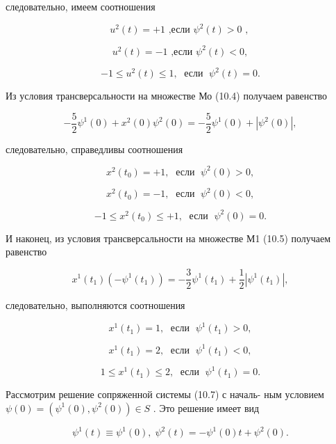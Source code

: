 \documentclass[8pt]{extarticle}
\begin{document}
следовательно, имеем соотношения

\[
{u}^{2}\left( t\right)  =  + 1\text{ ,если }{\psi }^{2}\left( t\right)  > 0\text{ , }
\]

\[
{u}^{2}\left( t\right)  =  - 1\text{ ,если }{\psi }^{2}\left( t\right)  < 0, \tag{10.8}
\]

\[
- 1 \leq  {u}^{2}\left( t\right)  \leq  1,\;\text{ если }\;{\psi }^{2}\left( t\right)  = 0.
\]

Из условия трансверсальности на множестве Мо (10.4) получаем равенство

\[
- \frac{5}{2}{\psi }^{1}\left( 0\right)  + {x}^{2}\left( 0\right) {\psi }^{2}\left( 0\right)  =  - \frac{5}{2}{\psi }^{1}\left( 0\right)  + \left| {{\psi }^{2}\left( 0\right) }\right| ,
\]

следовательно, справедливы соотношения

\[
{x}^{2}\left( {t}_{0}\right)  =  + 1,\;\text{ если }\;{\psi }^{2}\left( 0\right)  > 0,
\]

\[
{x}^{2}\left( {t}_{0}\right)  =  - 1,\;\text{ если }\;{\psi }^{2}\left( 0\right)  < 0, \tag{10.9}
\]

\[
- 1 \leq  {x}^{2}\left( {t}_{0}\right)  \leq   + 1,\;\text{ если }\;{\psi }^{2}\left( 0\right)  = 0.
\]

И наконец, из условия трансверсальности на множестве М1 (10.5) получаем равенство

\[
{x}^{1}\left( {t}_{1}\right) \left( {-{\psi }^{1}\left( {t}_{1}\right) }\right)  =  - \frac{3}{2}{\psi }^{1}\left( {t}_{1}\right)  + \frac{1}{2}\left| {{\psi }^{1}\left( {t}_{1}\right) }\right| ,
\]

следовательно, выполняются соотношения

\[
{x}^{1}\left( {t}_{1}\right)  = 1,\;\text{ если }\;{\psi }^{1}\left( {t}_{1}\right)  > 0,
\]

\[
{x}^{1}\left( {t}_{1}\right)  = 2,\;\text{ если }\;{\psi }^{1}\left( {t}_{1}\right)  < 0, \tag{10.10}
\]

\[
1 \leq  {x}^{1}\left( {t}_{1}\right)  \leq  2,\;\text{ если }\;{\psi }^{1}\left( {t}_{1}\right)  = 0.
\]

Рассмотрим решение сопряженной системы (10.7) с началь- ным условием \(\psi \left( 0\right)  = \left( {{\psi }^{1}\left( 0\right) ,{\psi }^{2}\left( 0\right) }\right)  \in  S\) . Это решение имеет вид

\[
{\psi }^{1}\left( t\right)  \equiv  {\psi }^{1}\left( 0\right) ,\;{\psi }^{2}\left( t\right)  =  - {\psi }^{1}\left( 0\right) t + {\psi }^{2}\left( 0\right) .
\]
\end{document}
